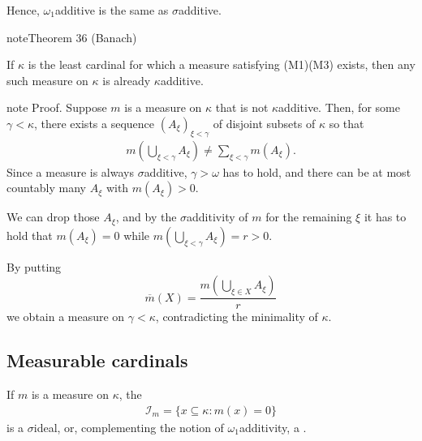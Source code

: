 \documentclass[letterpaper,10pt,english]{jupyterBook}
\begin{document}
\sphinxAtStartPar
Hence, \(\omega_1\)\sphinxhyphen{}additive is the same as \(\sigma\)\sphinxhyphen{}additive.
\label{large_cardinals:thm-kappa-additivity}
\begin{sphinxadmonition}{note}{Theorem 36 (Banach)}



\sphinxAtStartPar
If \(\kappa\) is the least cardinal for which a measure satisfying (M1)\sphinxhyphen{}(M3) exists, then any such measure on \(\kappa\) is already \(\kappa\)\sphinxhyphen{}additive.
\end{sphinxadmonition}

\begin{sphinxadmonition}{note}
\sphinxAtStartPar
Proof. Suppose \(m\) is a measure on \(\kappa\) that is not \(\kappa\)\sphinxhyphen{}additive.
Then, for some \(\gamma < \kappa\), there exists a sequence \((A_\xi)_{ \xi< \gamma}\) of disjoint subsets of \(\kappa\) so that
\begin{equation*}
\begin{split}
m(\bigcup_{\xi<\gamma} A_\xi) \ne  \sum_{\xi<\gamma} m(A_\xi).
\end{split}
\end{equation*}
\sphinxAtStartPar
Since a measure is always \(\sigma\)\sphinxhyphen{}additive, \(\gamma > \omega\) has to hold, and there can be at most countably many \(A_\xi\) with \(m(A_\xi)>0\).

\sphinxAtStartPar
We can drop those \(A_\xi\), and by the \(\sigma\)\sphinxhyphen{}additivity of \(m\) for the remaining \(\xi\) it has to hold that \(m(A_\xi)=0\) while \(m \left(\bigcup_{\xi<\gamma} A_\xi \right) = r >0\).

\sphinxAtStartPar
By putting
\begin{equation*}
\overline{m}(X) = \frac{m(\bigcup_{\xi \in X} A_\xi)}{r}
\end{equation*}
\sphinxAtStartPar
we obtain a measure on \(\gamma < \kappa\), contradicting the minimality of \(\kappa\).
\end{sphinxadmonition}


\subsection{Measurable cardinals}
\label{\detokenize{large_cardinals:measurable-cardinals}}
\sphinxAtStartPar
If \(m\) is a measure on \(\kappa\), the 
\begin{equation*}
\begin{split}
\mathcal{I}_m = \{x\subseteq \kappa \colon m(x) = 0 \}
\end{split}
\end{equation*}
\sphinxAtStartPar
is a \(\sigma\)\sphinxhyphen{}ideal, or, complementing the notion of \(\omega_1\)\sphinxhyphen{}additivity, a .
\end{document}
